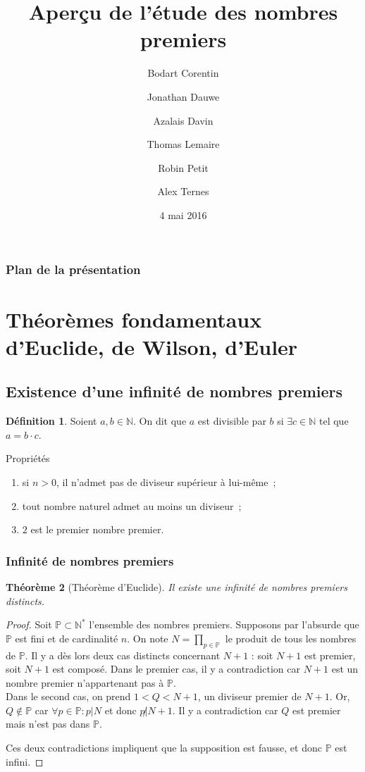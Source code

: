 \documentclass[10pt, mathserif]{beamer}
\title{Aperçu de l'étude des nombres premiers}
\author{Bodart Corentin %
	\and Jonathan Dauwe %
	\and Azalais Davin %
	\and Thomas Lemaire %
	\and Robin Petit %
	\and Alex Ternes}
\date{4 mai 2016}
\institute{Université Libre de Bruxelles}
\newcommand{\N}{\mathbb N}
\renewcommand{\P}{\mathbb P}
\newtheorem{thm}{Théorème}[section]
\theoremstyle{definition}
\newtheorem{déf}[thm]{Définition}
\theoremstyle{remark}
\begin{document}
	\frame{\titlepage}

	\begin{frame}
		\frametitle{Plan de la présentation}
		\tableofcontents
	\end{frame}

\section{Théorèmes fondamentaux d'Euclide, de Wilson, d'Euler}
	\subsection{Existence d'une infinité de nombres premiers}
	\begin{frame}
		\begin{déf}
			Soient $a, b \in \N$. On dit que $a$ est divisible par $b$ si $\exists c \in \N$ tel que $a = b \cdot c$.
		\end{déf}

		\begin{block}{Propriétés}
			\begin{enumerate}
				\item si $n > 0$, il n'admet pas de diviseur supérieur à lui-même~;
				\item tout nombre naturel admet au moins un diviseur~;
				\item $2$ est le premier nombre premier.
			\end{enumerate}
		\end{block}
	\end{frame}

	\begin{frame}
		\frametitle{Infinité de nombres premiers}
		\begin{thm}[Théorème d'Euclide]
			Il existe une infinité de nombres premiers distincts.
		\end{thm}

		\begin{proof}
			Soit $\P \subset \N^*$ l'ensemble des nombres premiers. Supposons par l'absurde que $\P$ est fini et de cardinalité $n$.
			On note $N = \prod_{p \in \P}$ le produit de tous les nombres de $\P$. Il y a dès lors deux cas distincts concernant $N+1$ :
			soit $N+1$ est premier, soit $N+1$ est composé. Dans le premier cas, il y a contradiction car $N+1$ est un nombre premier n'appartenant pas à $\P$. \\
			Dans le second cas, on prend $1 < Q < N+1$, un diviseur premier de $N+1$. Or, $Q \not \in \P$ car $\forall p \in \P : p | N$ et donc
			$p \not | N+1$. Il y a contradiction car $Q$ est premier mais n'est pas dans $\P$.

			Ces deux contradictions impliquent que la supposition est fausse, et donc $\P$ est infini.
		\end{proof}
	\end{frame}
\end{document}
